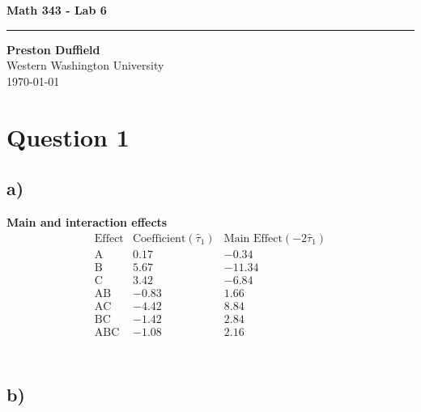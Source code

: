 \documentclass{article}
\begin{document}
\noindent
\begin{minipage}[t]{0.6\textwidth}
    \begin{flushleft}
        \LARGE\textbf{Math 343 - Lab 6} \\
        \vspace{6pt} %
        \hrule width 10cm
        \vspace{12pt}
        \large\textbf{Preston Duffield} \\
        \large Western Washington University \\
        \today
        \vspace{24pt}
    \end{flushleft}
\end{minipage}

\section*{Question 1}

\subsection*{a)}

\textbf{Main and interaction effects} \\

\begin{equation*}
\begin{array}{c|c|c}
    \text{Effect} &\text{Coefficient} (\hat{\tau}_1)& \text{Main Effect} (-2\hat{\tau}_1)\\
    \hline
    \text{A} &0.17    & -0.34\\
    \text{B} &5.67    & -11.34\\
    \text{C} &3.42    & -6.84\\
    \text{AB} &-0.83  & 1.66\\
    \text{AC} &-4.42  & 8.84\\
    \text{BC} &-1.42  & 2.84\\
    \text{ABC} &-1.08 & 2.16\\

\end{array}
\end{equation*}\\

\subsection*{b)}
\end{document}
